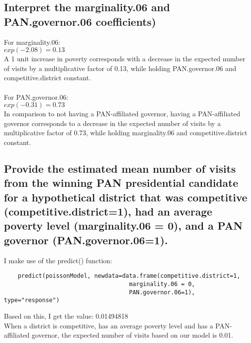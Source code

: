 \documentclass{article}
\begin{document}
\subsection{Interpret the marginality.06 and PAN.governor.06 
coefficients)}

For marginality.06: 
\\
$exp(-2.08) = 0.13$
\\
A 1 unit increase in poverty corresponds with a decrease in the expected number of visits by a multiplicative factor of 0.13, while holding PAN.governor.06 and competitive.district constant.
\\
\\
For PAN.governor.06:
\\
$exp(-0.31) = 0.73$
\\
In comparison to not having a PAN-affiliated governor, having a PAN-affiliated governor corresponds to a decrease in the expected number of visits by a multiplicative factor of 0.73, while holding marginality.06 and competitive.district constant.

\subsection{Provide the estimated mean number of visits from the winning 
PAN presidential candidate for a hypothetical district that was 
competitive (competitive.district=1), had an average poverty level 
(marginality.06 = 0), and a PAN governor (PAN.governor.06=1).}

I make use of the predict() function:
\begin{verbatim}
    predict(poissonModel, newdata=data.frame(competitive.district=1, 
                                    marginality.06 = 0, 
                                    PAN.governor.06=1), type="response")

\end{verbatim}

Based on this, I get the value: 0.01494818 
\\
When a district is competitive, has an average poverty level and has a PAN-affiliated governor, the expected number of visits based on our model is 0.01.
\end{document}
